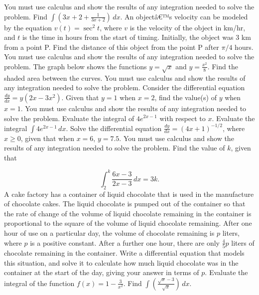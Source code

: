 \documentclass[12pt,addpoints]{exam}
\begin{document}
\begin{questions}
You must use calculus and show the results of any integration needed to solve the problem.
\fillwithlines{3cm}
\question[5] Find \(\int \left( 3x + 2 + \frac{1}{3x + 2} \right) \, dx\).
\fillwithlines{3cm}
\question[5] An objectâ€™s velocity can be modeled by the equation \(v(t) = \sec^2 t\), where \(v\) is the velocity of the object in km/hr, and \(t\) is the time in hours from the start of timing. Initially, the object was 3 km from a point P. Find the distance of this object from the point P after \(\pi/4\) hours. You must use calculus and show the results of any integration needed to solve the problem.
\fillwithlines{3cm}
\question[5] The graph below shows the functions \( y = \sqrt{x} \) and \( y = \frac{x^2}{8} \). Find the shaded area between the curves. You must use calculus and show the results of any integration needed to solve the problem.
\fillwithlines{3cm}
\question[5] Consider the differential equation \( \frac{dy}{dx} = y(2x - 3x^2) \). Given that \( y = 1 \) when \( x = 2 \), find the value(s) of \( y \) when \( x = 1 \). You must use calculus and show the results of any integration needed to solve the problem.
\fillwithlines{3cm}
\question[5] Evaluate the integral of \(4e^{2x-1}\) with respect to \(x\).
\fillwithlines{3cm}
\question[5] Evaluate the integral \(\int 4e^{2x-1} \, dx\).
\fillwithlines{3cm}
\question[5] Solve the differential equation \(\frac{dy}{dx} = (4x+1)^{-1/2}\), where \(x \geq 0\), given that when \(x = 6\), \(y = 7.5\). You must use calculus and show the results of any integration needed to solve the problem.
\fillwithlines{3cm}
\question[5] Find the value of \( k \), given that

\[
\int_{2}^{k} \frac{6x - 3}{2x - 3} \, dx = 3k.
\]
\fillwithlines{3cm}
\question[5] A cake factory has a container of liquid chocolate that is used in the manufacture of chocolate cakes. The liquid chocolate is pumped out of the container so that the rate of change of the volume of liquid chocolate remaining in the container is proportional to the square of the volume of liquid chocolate remaining. After one hour of use on a particular day, the volume of chocolate remaining is \( p \) liters, where \( p \) is a positive constant. After a further one hour, there are only \( \frac{4}{5} p \) liters of chocolate remaining in the container. Write a differential equation that models this situation, and solve it to calculate how much liquid chocolate was in the container at the start of the day, giving your answer in terms of \( p \).
\fillwithlines{3cm}
\question[5] Evaluate the integral of the function \( f(x) = 1 - \frac{3}{x^2} \).
\fillwithlines{3cm}
\question[5] Find \(\int \left( \frac{\sqrt{x} - 3}{\sqrt{x}} \right) \, dx\).
\fillwithlines{3cm}

\end{questions}
\end{document}
